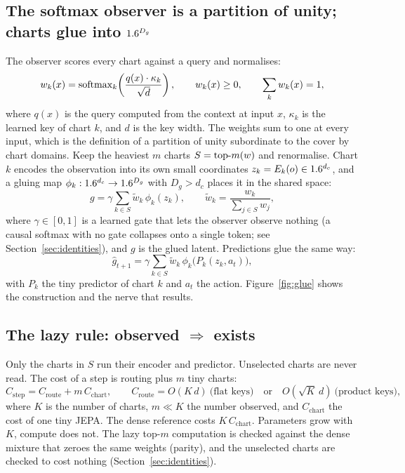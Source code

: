 \subsection{The softmax observer is a partition of unity; charts glue into \texorpdfstring{$1.6^{D_g}$}{R\^{}Dg}}

The observer scores every chart against a query and normalises:
\begin{equation}\label{eq:pou}
  w_k(x)=\operatorname{softmax}_k\!\left(\frac{q(x)\cdot\kappa_k}{\sqrt d}\right),\qquad w_k(x)\ge 0,\qquad \sum_k w_k(x)=1,
\end{equation}
where $q(x)$ is the query computed from the context at input $x$, $\kappa_k$ is the learned key of chart $k$, and $d$ is the key width. The weights sum to one at every input, which is the definition of a partition of unity subordinate to the cover by chart domains. Keep the heaviest $m$ charts $S=\text{top-}m(w)$ and renormalise. Chart $k$ encodes the observation into its own small coordinates $z_k=E_k(o)\in1.6^{d_c}$, and a gluing map $\phi_k:1.6^{d_c}\to1.6^{D_g}$ with $D_g>d_c$ places it in the shared space:
\begin{equation}\label{eq:glue}
  g=\gamma\sum_{k\in S}\tilde w_k\,\phi_k(z_k),\qquad \tilde w_k=\frac{w_k}{\sum_{j\in S}w_j},
\end{equation}
where $\gamma\in[0,1]$ is a learned gate that lets the observer observe nothing (a causal softmax with no gate collapses onto a single token; see Section~\ref{sec:identities}), and $g$ is the glued latent. Predictions glue the same way:
\begin{equation}\label{eq:predglue}
  \hat g_{t+1}=\gamma\sum_{k\in S}\tilde w_k\,\phi_k\big(P_k(z_k,a_t)\big),
\end{equation}
with $P_k$ the tiny predictor of chart $k$ and $a_t$ the action. Figure~\ref{fig:glue} shows the construction and the nerve that results.

\begin{figure}[t]
  \centering
  
\end{figure}

\subsection{The lazy rule: observed \texorpdfstring{$\Rightarrow$}{implies} exists}

Only the charts in $S$ run their encoder and predictor. Unselected charts are never read. The cost of a step is routing plus $m$ tiny charts:
\begin{equation}\label{eq:cost}
  C_{\text{step}}=C_{\text{route}}+m\,C_{\text{chart}},\qquad C_{\text{route}}=O(K\,d)\ \text{(flat keys)}\quad\text{or}\quad O(\sqrt K\,d)\ \text{(product keys)},
\end{equation}
where $K$ is the number of charts, $m\ll K$ the number observed, and $C_{\text{chart}}$ the cost of one tiny JEPA. The dense reference costs $K\,C_{\text{chart}}$. Parameters grow with $K$, compute does not. The lazy top-$m$ computation is checked against the dense mixture that zeroes the same weights (parity), and the unselected charts are checked to cost nothing (Section~\ref{sec:identities}).

